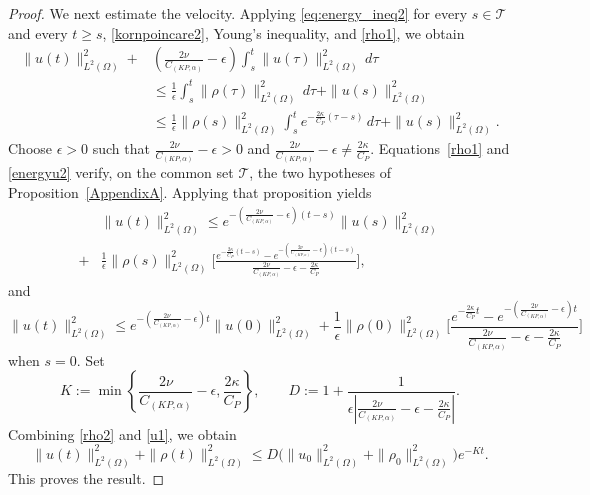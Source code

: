 \documentclass[11pt,reqno]{amsart}
\theoremstyle{plain}
\numberwithin{equation}{section}
\begin{document}
\begin{proof}
We next estimate the velocity. Applying \eqref{eq:energy_ineq2} for every $s\in\mathcal T$ and every $t\ge s$, \eqref{kornpoincare2}, Young's inequality, and \eqref{rho1}, we obtain 
\begin{equation}\label{energyu2}
\begin{split}
\|u(t)\|^2_{L^2(\Omega)}+&(\frac{2\nu}{C_{(KP,\alpha)}}-\epsilon)\int_s^t\|u(\tau)\|^2_{L^2(\Omega)}\,d\tau 
\\&\le \frac{1}{\epsilon}\int_s^t\|\rho(\tau)\|^2_{L^2{(\Omega)}}\,d\tau+\|u(s)\|^2_{L^2(\Omega)}\\& \le\frac{1}{\epsilon}\|\rho(s)\|^2_{L^2(\Omega)}\int_s^te^{-\frac{2\kappa}{C_P}(\tau-s)}\,d\tau+\|u(s)\|^2_{L^2(\Omega)}.
\end{split}
\end{equation}
Choose $\epsilon>0$ such that $\frac{2\nu}{C_{(KP,\alpha)}}-\epsilon>0$ and $\frac{2\nu}{C_{(KP,\alpha)}}-\epsilon\neq \frac{2\kappa}{C_P}$. Equations~\eqref{rho1} and \eqref{energyu2} verify, on the common set $\mathcal T$, the two hypotheses of Proposition~\ref{AppendixA}.  Applying that proposition yields
\begin{equation}\label{u0}
\begin{split}
    &\|u(t)\|^2_{L^2(\Omega)}\le e^{-(\frac{2\nu}{C_{(KP,\alpha)}}-\epsilon)(t-s)}\|u(s)\|^2_{L^2(\Omega)}\\
    +&\frac{1}{\epsilon}\|\rho(s)\|^2_{L^2(\Omega)}\big[\frac{e^{-\frac{2\kappa}{C_P}(t-s)}-e^{-(\frac{2\nu}{C_{(KP,\alpha)}}-\epsilon)(t-s)}}{\frac{2\nu}{C_{(KP,\alpha)}}-\epsilon-\frac{2\kappa}{C_P}}\big],
\end{split}
\end{equation}
and
\begin{equation}\label{u1}
    \|u(t)\|^2_{L^2(\Omega)}\le e^{-(\frac{2\nu}{C_{(KP,\alpha)}}-\epsilon)t}\|u(0)\|^2_{L^2(\Omega)}+\frac{1}{\epsilon}\|\rho(0)\|^2_{L^2(\Omega)}\big[\frac{e^{-\frac{2\kappa}{C_P}t}-e^{-(\frac{2\nu}{C_{(KP,\alpha)}}-\epsilon)t}}{\frac{2\nu}{C_{(KP,\alpha)}}-\epsilon-\frac{2\kappa}{C_P}}\big]
\end{equation}
when $s=0$.
Set
\[
K:=\min\left\{\frac{2\nu}{C_{(KP,\alpha)}}-\epsilon,\frac{2\kappa}{C_P}\right\},
\qquad
D:=1+\frac{1}{\epsilon\left|\frac{2\nu}{C_{(KP,\alpha)}}-\epsilon-\frac{2\kappa}{C_P}\right|}.
\]
Combining \eqref{rho2} and \eqref{u1}, we obtain
\[
\|u(t)\|_{L^2(\Omega)}^2+\|\rho(t)\|_{L^2(\Omega)}^2
\le
D\bigl(\|u_0\|_{L^2(\Omega)}^2+\|\rho_0\|_{L^2(\Omega)}^2\bigr)e^{-Kt}.
\]
This proves the result.
\end{proof}
\end{document}
